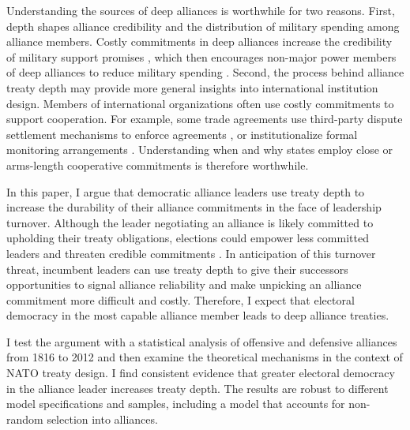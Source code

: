 \documentclass[12pt]{article}
\begin{document}
Understanding the sources of deep alliances is worthwhile for two reasons.
First, depth shapes alliance credibility and the distribution of military spending among alliance members. 
Costly commitments in deep alliances increase the credibility of military support promises \citep{Morrow1994}, which then encourages non-major power members of deep alliances to reduce military spending \citep{Alley2020}.  
Second, the process behind alliance treaty depth may provide more general insights into international institution design. 
Members of international organizations often use costly commitments to support cooperation. 
For example, some trade agreements use third-party dispute settlement mechanisms to enforce agreements \citep{Smith2000}, or institutionalize formal monitoring arrangements \citep{Duretal2013}.  
Understanding when and why states employ close or arms-length cooperative commitments is therefore worthwhile. 


In this paper, I argue that democratic alliance leaders use treaty depth to increase the durability of their alliance commitments in the face of leadership turnover. 
Although the leader negotiating an alliance is likely committed to upholding their treaty obligations, elections could empower less committed leaders and threaten credible commitments \citep{GartzkeGleditsch2004, LeedsSavun2007, Leedsetal2009}.
In anticipation of this turnover threat, incumbent leaders can use treaty depth to give their successors opportunities to signal alliance reliability and make unpicking an alliance commitment more difficult and costly. 
Therefore, I expect that electoral democracy in the most capable alliance member leads to deep alliance treaties. 


I test the argument with a statistical analysis of offensive and defensive alliances from 1816 to 2012 and then examine the theoretical mechanisms in the context of NATO treaty design.
I find consistent evidence that greater electoral democracy in the alliance leader increases treaty depth. 
The results are robust to different model specifications and samples, including a model that accounts for non-random selection into alliances. 
\end{document}
